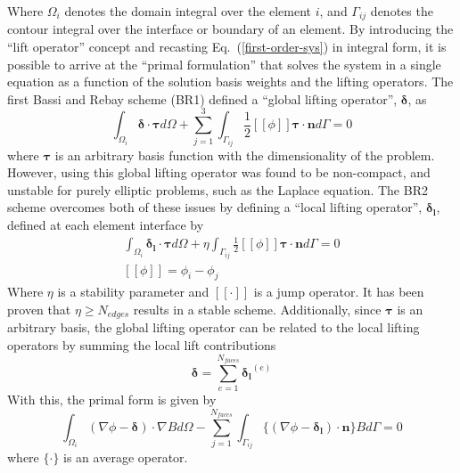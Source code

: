 \documentclass[a4paper]{article}
\newcommand{\eref}[1]{Eq.~(\ref{#1})}
\newcommand{\dint}[1]{\int_{\Omega_i}{#1 d\Omega}}
\newcommand{\sint}[1]{\int_{\Gamma_{ij}}{#1 d\Gamma}}
\newcommand{\average}[1]{\ensuremath{\{#1\}} }
\newcommand{\jump}[1]{\ensuremath{[\![#1]\!]} }
\newcommand{\vbasis}{\boldsymbol{\tau}}
\newcommand{\glift}{\boldsymbol{\delta}}
\newcommand{\llift}{\boldsymbol{\delta_l}}
\newcommand{\unitn}{\mathbf{n}}
\begin{document}
Where $\Omega_i$ denotes the domain integral over the element $i$, and
$\Gamma_{ij}$ denotes the contour integral over the interface or boundary of an
element.
By introducing the ``lift operator'' concept and recasting
\eref{first-order-sys} in integral form, it is possible to arrive at the
``primal formulation'' that solves the system in a single equation as a function
of the solution basis weights and the lifting operators.  The first Bassi and
Rebay scheme (BR1) defined a ``global lifting operator'', $\glift$, as
\begin{equation}
  \dint{\glift \cdot \vbasis} + \sum_{j=1}^3\sint{\frac{1}{2} \jump{\phi}
  \vbasis \cdot \unitn} = 0
  \label{global-lift-def}
\end{equation}
where $\vbasis$ is an arbitrary basis function with the dimensionality of the
problem. However, using this global lifting operator was found to be
non-compact, and unstable for purely elliptic problems, such as the Laplace
equation. The BR2 scheme overcomes both of these issues by defining a ``local
lifting operator'', $\llift$, defined at each element interface by
\begin{equation}
  \begin{gathered}
    \dint{\llift \cdot \vbasis} + \eta\sint{\frac{1}{2} \jump{\phi} \vbasis
    \cdot \unitn} = 0 \\
    \jump{\phi} = \phi_i - \phi_j
  \end{gathered}
  \label{local-lift-def}
\end{equation}
Where $\eta$ is a stability parameter and $\jump{\cdot}$ is a jump operator.  It
has been proven that $\eta \geq N_{edges}$ results in a stable scheme.
Additionally, since $\vbasis$ is an arbitrary basis, the global lifting operator
can be related to the local lifting operators by summing the local lift
contributions
\begin{equation}
  \glift = \sum_{e=1}^{N_{faces}}{\llift^{(e)}}
  \label{local-global-relation}
\end{equation}
With this, the primal form is given by
\begin{equation}
  \dint{(\nabla \phi - \glift)\cdot \nabla B} -
  \sum_{j=1}^{N_{faces}}\sint{\average{(\nabla \phi - \llift)\cdot\unitn}B} = 0
  \label{primal-form}
\end{equation}
where $\average{\cdot}$ is an average operator.
\end{document}
